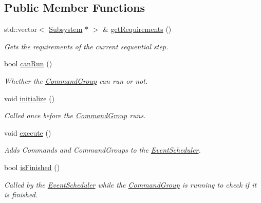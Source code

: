 \subsection*{Public Member Functions}
\begin{DoxyCompactItemize}
\item 
std\+::vector$<$ \mbox{\hyperlink{classlib_iterative_robot_1_1_subsystem}{Subsystem}} $\ast$ $>$ \& \mbox{\hyperlink{classlib_iterative_robot_1_1_command_group_abf3d539920648f9dec9dfdef30699c82}{get\+Requirements}} ()
\begin{DoxyCompactList}\small\item\em Gets the requirements of the current sequential step. \end{DoxyCompactList}\item 
bool \mbox{\hyperlink{classlib_iterative_robot_1_1_command_group_abd75c9b52e6b4ae5af1b6724e865311f}{can\+Run}} ()
\begin{DoxyCompactList}\small\item\em Whether the \mbox{\hyperlink{classlib_iterative_robot_1_1_command_group}{Command\+Group}} can run or not. \end{DoxyCompactList}\item 
void \mbox{\hyperlink{classlib_iterative_robot_1_1_command_group_a99800c5dbd05ab750aa0bb27518d0467}{initialize}} ()
\begin{DoxyCompactList}\small\item\em Called once before the \mbox{\hyperlink{classlib_iterative_robot_1_1_command_group}{Command\+Group}} runs. \end{DoxyCompactList}\item 
void \mbox{\hyperlink{classlib_iterative_robot_1_1_command_group_a5e91d370cafde43548d79945ccb4d8fe}{execute}} ()
\begin{DoxyCompactList}\small\item\em Adds Commands and Command\+Groups to the \mbox{\hyperlink{classlib_iterative_robot_1_1_event_scheduler}{Event\+Scheduler}}. \end{DoxyCompactList}\item 
bool \mbox{\hyperlink{classlib_iterative_robot_1_1_command_group_a96807a2763adf9e21ebf2cb9e3574e3c}{is\+Finished}} ()
\begin{DoxyCompactList}\small\item\em Called by the \mbox{\hyperlink{classlib_iterative_robot_1_1_event_scheduler}{Event\+Scheduler}} while the \mbox{\hyperlink{classlib_iterative_robot_1_1_command_group}{Command\+Group}} is running to check if it is finished. \end{DoxyCompactList}\item 

\end{DoxyCompactItemize}
